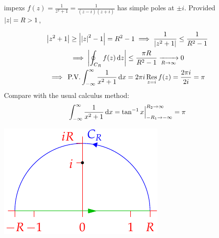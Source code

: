 \goodbreak


\begin{examples}{}{impexs}
	\exstart $f(z)=\frac 1{z^2+1}=\frac 1{(z-i)(z+i)}$ has simple poles at $\pm i$. Provided $\left| z\right|=R>1$,
	\begin{enumerate}\setcounter{enumi}{1}
	  \begin{minipage}[t]{0.65\linewidth}\vspace{-10pt}
	  \item[]\begin{gather*}
		  \left| z^2+1\right|\ge \left| \left| z\right|^2-1\right|=R^2-1
		  \implies\frac 1{\left| z^2+1\right|}\le\frac 1{R^2-1}\\
		  \implies\left| \oint_{C_R}f(z)\,{\mathrm{d} z}\right|\le \frac{\pi R}{R^2-1}\xrightarrow[R\to\infty]{}0\\
		  \implies \,\text{P.V.}\int_{-\infty}^\infty\frac 1{x^2+1}\,{\mathrm{d} x}
		  	=2\pi i\operatorname*{Res}_{z=i}f(z)=\frac{2\pi i}{2i}=\pi
	  \end{gather*}
	  Compare with the usual calculus method:
	  \[
	  	\int_{-\infty}^\infty \frac 1{x^2+1}\,{\mathrm{d} x}=\tan^{-1}x\Big|_{-R_1\to-\infty}^{R_2\to\infty}=\pi
	  \]
		\end{minipage}
		\hfill
		\begin{minipage}[t]{0.34\linewidth}\vspace{0pt}
			\flushright\includegraphics[scale=0.95]{integral2}
		\end{minipage}\smallbreak
	  

\end{enumerate}
\end{examples}
